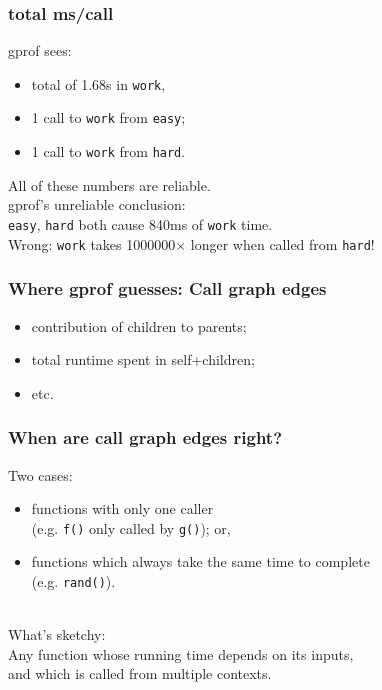 \begin{frame}
  \frametitle{total ms/call}

  gprof sees:
  \begin{itemize}
    \item total of 1.68s in {\tt work},\\
    \item 1 call to {\tt work} from {\tt easy};
    \item 1 call to {\tt work} from {\tt hard}.
  \end{itemize}
  All of these numbers are reliable.\\[1em]
  gprof's unreliable conclusion: \\ {\tt easy}, {\tt hard} 
  both cause 840ms of {\tt work} time.\\[1em]
  
  \alert{Wrong}: {\tt work} takes 1000000$\times$ longer when called from {\tt hard}!

\end{frame}

\begin{frame}
  \frametitle{Where gprof guesses: Call graph edges}
  
    \begin{itemize}
  \item contribution of children to parents;
  \item total runtime spent in self+children;
  \item etc.
    \end{itemize}
  
\end{frame}

\begin{frame}
  \frametitle{When are call graph edges right?}

    Two cases:
    \begin{itemize}
    \item functions with only one caller\\
      (e.g. {\tt f()} only called by {\tt g()}); or,
    \item functions which always take the same time to complete\\
      (e.g. {\tt rand()}).
    \end{itemize}
    ~\\
    What's sketchy:\\
    Any function whose running time depends on its inputs,\\
    and which is called from multiple contexts.
    
  
\end{frame}

